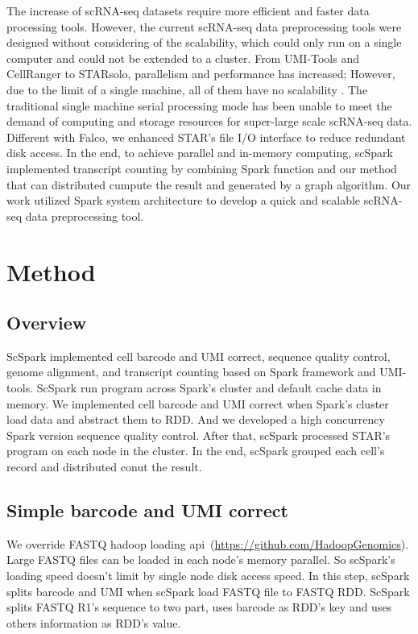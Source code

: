 \documentclass[conference]{IEEEtran}
\begin{document}
The increase of scRNA-seq datasets require more efficient and faster data processing tools.
However, the current scRNA-seq data preprocessing tools were designed without considering of the scalability, which could only run on a single computer and could not be extended to a cluster. From UMI-Tools and CellRanger to STARsolo, parallelism and performance has increased; However, due to the limit of a single machine, all of them have no scalability . 
The traditional single machine serial processing mode has been unable to meet the demand of computing and storage resources for super-large scale scRNA-seq data.
Different with Falco, we enhanced STAR's file I/O interface to reduce redundant disk access.
In the end, to achieve parallel and in-memory computing, scSpark implemented transcript counting by combining Spark function and our method that can distributed cumpute the result and generated by a graph algorithm.
Our work utilized Spark system architecture to develop a quick and scalable scRNA-seq data preprocessing tool. 

\fi


\section{Method}
\subsection{Overview}
ScSpark implemented cell barcode and UMI correct, sequence quality control, genome alignment, and transcript counting based on Spark framework and UMI-tools.
ScSpark run program across Spark's cluster and default cache data in memory. 
We implemented cell barcode and UMI correct when Spark's cluster load data and abstract them to RDD.
And we developed a high concurrency Spark version sequence quality control. 
After that, scSpark processed STAR's program on each node in the cluster.
In the end, scSpark grouped each cell's record and distributed conut the result.

\subsection{Simple barcode and UMI correct}
We override FASTQ hadoop loading api~(\url{https://github.com/HadoopGenomics}).
Large FASTQ files can be loaded in each node's memory parallel.
So scSpark's loading speed doesn't limit by single node disk access speed.
In this step, scSpark splits barcode and UMI when scSpark load FASTQ file to FASTQ RDD.
ScSpark splits FASTQ R1's sequence to two part, uses barcode as RDD's key and uses others information as RDD's value.
\end{document}
